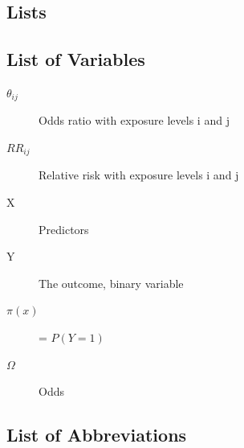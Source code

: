 \documentclass[10pt,a4paper]{report}
\begin{document}
\begin{appendices}

\chapter{Lists}

\section*{List of Variables}

\begin{description}
\item[$\theta_{ij}$]
  Odds ratio with exposure levels i and j
\item[$RR_{ij}$]
  Relative risk with exposure levels i and j
\item[X]
  Predictors
\item[Y]
  The outcome, binary variable
\item[$\pi(x)$]
  = $P(Y=1)$
\item[$\Omega$]
  Odds
\end{description}

\section*{List of Abbreviations}


\end{appendices}
\end{document}
